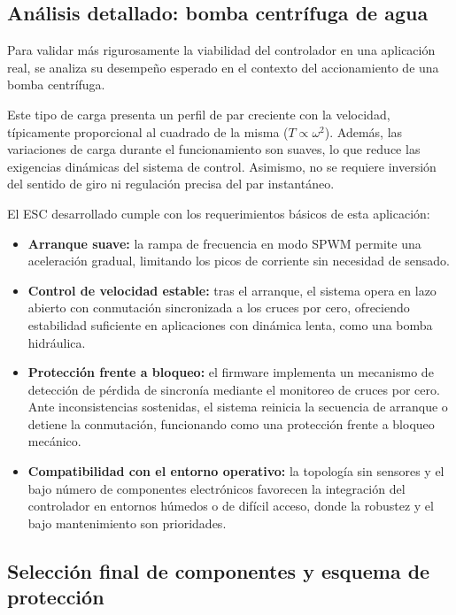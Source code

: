 \subsection*{Análisis detallado: bomba centrífuga de agua}

Para validar más rigurosamente la viabilidad del controlador en una aplicación real, se analiza su desempeño esperado en el contexto del accionamiento de una bomba centrífuga.

Este tipo de carga presenta un perfil de par creciente con la velocidad, típicamente proporcional al cuadrado de la misma (\( T \propto \omega^2 \)). Además, las variaciones de carga durante el funcionamiento son suaves, lo que reduce las exigencias dinámicas del sistema de control. Asimismo, no se requiere inversión del sentido de giro ni regulación precisa del par instantáneo.

El ESC desarrollado cumple con los requerimientos básicos de esta aplicación:

\begin{itemize}
    \item \textbf{Arranque suave:} la rampa de frecuencia en modo SPWM permite una aceleración gradual, limitando los picos de corriente sin necesidad de sensado.
    \item \textbf{Control de velocidad estable:} tras el arranque, el sistema opera en lazo abierto con conmutación sincronizada a los cruces por cero, ofreciendo estabilidad suficiente en aplicaciones con dinámica lenta, como una bomba hidráulica.
    \item \textbf{Protección frente a bloqueo:} el firmware implementa un mecanismo de detección de pérdida de sincronía mediante el monitoreo de cruces por cero. Ante inconsistencias sostenidas, el sistema reinicia la secuencia de arranque o detiene la conmutación, funcionando como una protección frente a bloqueo mecánico.
    \item \textbf{Compatibilidad con el entorno operativo:} la topología sin sensores y el bajo número de componentes electrónicos favorecen la integración del controlador en entornos húmedos o de difícil acceso, donde la robustez y el bajo mantenimiento son prioridades.

\end{itemize}


\subsection*{Selección final de componentes y esquema de protección}

